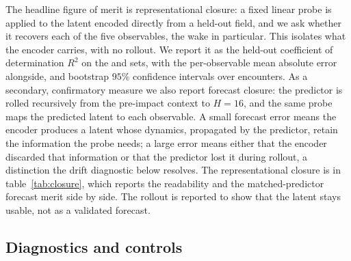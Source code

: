 The headline figure of merit is representational closure: a fixed linear probe is applied to the latent encoded directly from a held-out field, and we ask whether it recovers each of the five observables, the wake in particular. This isolates what the encoder carries, with no rollout. We report it as the held-out coefficient of determination $R^2$ on the \TestSplit{} and \BoundarySplit{} sets, with the per-observable mean absolute error alongside, and bootstrap $95\%$ confidence intervals over encounters. As a secondary, confirmatory measure we also report forecast closure: the predictor is rolled recursively from the pre-impact context to $H = 16$, and the same probe maps the predicted latent to each observable. A small forecast error means the encoder produces a latent whose dynamics, propagated by the predictor, retain the information the probe needs; a large error means either that the encoder discarded that information or that the predictor lost it during rollout, a distinction the drift diagnostic below resolves. The representational closure is in table~\ref{tab:closure}, which reports the readability and the matched-predictor forecast merit side by side. The rollout is reported to show that the latent stays usable, not as a validated forecast.\re




\subsection{Diagnostics and controls}
\label{sec:methods_diag}

